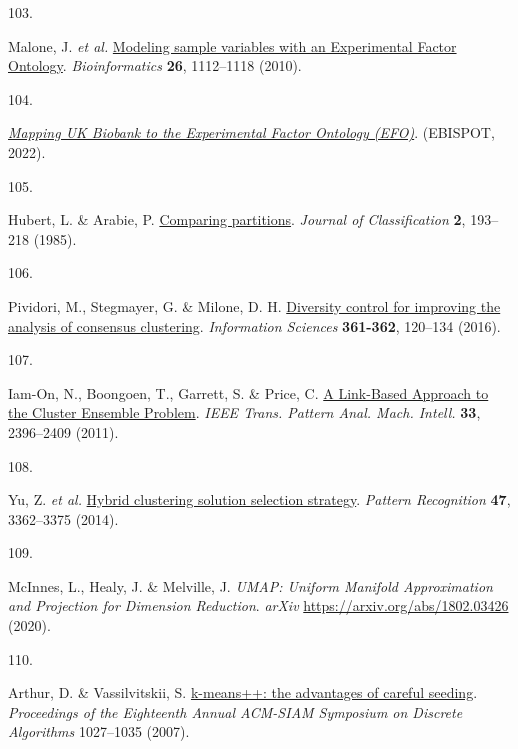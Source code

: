 \documentclass[
  a4paper,
]{article}
\newlength{\cslhangindent}
\newlength{\csllabelwidth}
\newlength{\cslentryspacingunit} %
\newenvironment{CSLReferences}[2] %
 {%
  \setlength{\parindent}{0pt}
  \ifodd #1
  \let\oldpar\par
  \def\par{\hangindent=\cslhangindent\oldpar}
  \fi
  \setlength{\parskip}{#2\cslentryspacingunit}
 }%
 {}
\newcommand{\CSLLeftMargin}[1]{\parbox[t]{\csllabelwidth}{#1}}
\newcommand{\CSLRightInline}[1]{\parbox[t]{\linewidth - \csllabelwidth}{#1}\break}
\begin{document}
\begin{CSLReferences}{0}{0}
\leavevmode{}%
\CSLLeftMargin{103. }%
\CSLRightInline{Malone, J. \emph{et al.} \href{https://doi.org/10.1093/bioinformatics/btq099}{Modeling sample variables with an Experimental Factor Ontology}. \emph{Bioinformatics} \textbf{26}, 1112--1118 (2010).}

\leavevmode{}%
\CSLLeftMargin{104. }%
\CSLRightInline{\emph{\href{https://github.com/EBISPOT/EFO-UKB-mappings}{Mapping UK Biobank to the Experimental Factor Ontology (EFO)}}. (EBISPOT, 2022).}

\leavevmode{}%
\CSLLeftMargin{105. }%
\CSLRightInline{Hubert, L. \& Arabie, P. \href{https://doi.org/10.1007/bf01908075}{Comparing partitions}. \emph{Journal of Classification} \textbf{2}, 193--218 (1985).}

\leavevmode{}%
\CSLLeftMargin{106. }%
\CSLRightInline{Pividori, M., Stegmayer, G. \& Milone, D. H. \href{https://doi.org/10.1016/j.ins.2016.04.027}{Diversity control for improving the analysis of consensus clustering}. \emph{Information Sciences} \textbf{361-362}, 120--134 (2016).}

\leavevmode{}%
\CSLLeftMargin{107. }%
\CSLRightInline{Iam-On, N., Boongoen, T., Garrett, S. \& Price, C. \href{https://doi.org/10.1109/tpami.2011.84}{A Link-Based Approach to the Cluster Ensemble Problem}. \emph{IEEE Trans. Pattern Anal. Mach. Intell.} \textbf{33}, 2396--2409 (2011).}

\leavevmode{}%
\CSLLeftMargin{108. }%
\CSLRightInline{Yu, Z. \emph{et al.} \href{https://doi.org/10.1016/j.patcog.2014.04.005}{Hybrid clustering solution selection strategy}. \emph{Pattern Recognition} \textbf{47}, 3362--3375 (2014).}

\leavevmode{}%
\CSLLeftMargin{109. }%
\CSLRightInline{McInnes, L., Healy, J. \& Melville, J. \emph{UMAP: Uniform Manifold Approximation and Projection for Dimension Reduction}. \emph{arXiv} \url{https://arxiv.org/abs/1802.03426} (2020).}

\leavevmode{}%
\CSLLeftMargin{110. }%
\CSLRightInline{Arthur, D. \& Vassilvitskii, S. \href{http://ilpubs.stanford.edu:8090/778/1/2006-13.pdf}{k-means++: the advantages of careful seeding}. \emph{Proceedings of the Eighteenth Annual ACM-SIAM Symposium on Discrete Algorithms} 1027--1035 (2007).}


\end{CSLReferences}
\end{document}

